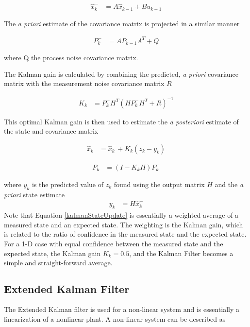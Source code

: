 \begin{align}
\hat{x}^-_k &= A\hat{x}_{k-1}+Bu_{k-1}
\end{align}

The \textit{a priori} estimate of the covariance matrix is projected in a similar manner

\begin{align}
P^-_k &= AP_{k-1}A^T+Q
\end{align}

where Q the process noise covariance matrix.

The Kalman gain is calculated by combining the predicted, \textit{a priori} covariance matrix with the measurement noise covariance matrix $R$

\begin{align}
K_k &=P^-_kH^T(HP^-_kH^T + R)^{-1}
\end{align}

This optimal Kalman gain is then used to estimate the \textit{a posteriori} estimate of the state and covariance matrix

\begin{align}
\label{kalmanStateUpdate}
\hat{x}_k &=\hat{x}^-_k+K_k(z_k-y_k)
\end{align}

\begin{align}
P_k &= (I-K_kH)P^-_k
\end{align}

where $y_k$ is the predicted value of $z_k$ found using the output matrix $H$ and the \textit{a priori} state estimate
\begin{align}
y_k &= H\hat{x}^-_k
\end{align}
Note that Equation \ref{kalmanStateUpdate} is essentially a weighted average of a measured state and an expected state. The weighting is the Kalman gain, which is related to the ratio of confidence in the measured state and the expected state. For a 1-D case with equal confidence between the measured state and the expected state, the Kalman gain $K_k = 0.5$, and the Kalman Filter becomes a simple and straight-forward average.


\subsection*{Extended Kalman Filter}
\label{EKFTheory}
The Extended Kalman filter is used for a non-linear system and is essentially a linearization of a nonlinear plant. A non-linear system can be described as \cite{welch1995introduction}

